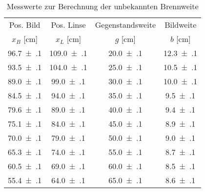 \begin{table}[!h]
	\centering
	\begin{tabular}{|c|c|c|c|}
		\hline
		Pos. Bild & Pos. Linse & Gegenstandsweite & Bildweite\\
		$x_{B}$ [\si{\centi\meter}] & $x_{L}$ [\si{\centi\meter}] & $g$ [\si{\centi\meter}] & $b$ [\si{\centi\meter}]\\
\hline\hline
		\num{96.7(1)} & \num{109.0(1)} & \num{20.0(1)} & \num{12.3(1)}\\
		\num{93.5(1)} & \num{104.0(1)} & \num{25.0(1)} & \num{10.5(1)}\\
		\num{89.0(1)} & \num{99.0(1)} & \num{30.0(1)} & \num{10.0(1)}\\
		\num{84.5(1)} & \num{94.0(1)} & \num{35.0(1)} & \num{9.5(1)}\\
		\num{79.6(1)} & \num{89.0(1)} & \num{40.0(1)} & \num{9.4(1)}\\
		\num{75.1(1)} & \num{84.0(1)} & \num{45.0(1)} & \num{8.9(1)}\\
		\num{70.0(1)} & \num{79.0(1)} & \num{50.0(1)} & \num{9.0(1)}\\
		\num{65.3(1)} & \num{74.0(1)} & \num{55.0(1)} & \num{8.7(1)}\\
		\num{60.5(1)} & \num{69.0(1)} & \num{60.0(1)} & \num{8.5(1)}\\
		\num{55.4(1)} & \num{64.0(1)} & \num{65.0(1)} & \num{8.6(1)}\\
		\hline
	\end{tabular}
	\caption{Messwerte zur Berechnung der unbekannten Brennweite \label{tab:Auswertung_Messwerte_II}}
\end{table}
